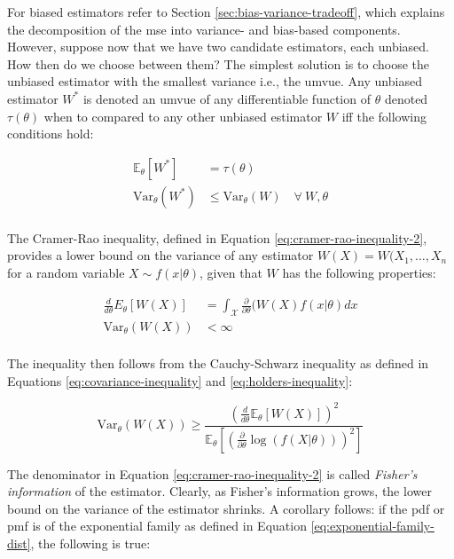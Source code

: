 \documentclass{report}
\begin{document}
For biased estimators refer to Section \ref{sec:bias-variance-tradeoff}, which explains the decomposition of the \gls{mse} into variance- and bias-based components. However, suppose now that we have two candidate estimators, each unbiased. How then do we choose between them? The simplest solution is to choose the unbiased estimator with the smallest variance i.e., the \gls{umvue}. Any unbiased estimator $W^*$ is denoted an \gls{umvue} of any differentiable function of $\theta$ denoted $\tau(\theta)$ when to compared to any other unbiased estimator $W$ \gls{iff} the following conditions hold:

\begin{equation}\label{eq:umvue-properties}
    \begin{aligned}
        \mathbb{E}_\theta[W^*] &= \tau(\theta) \\
        \text{Var}_\theta(W^*) &\leq \text{Var}_\theta(W) \quad \forall \: W, \theta \\
    \end{aligned}
\end{equation}

The Cramer-Rao inequality, defined in Equation \ref{eq:cramer-rao-inequality-2}, provides a lower bound on the variance of any estimator $W(X) = W(X_1, \dots, X_n$ for a random variable $X \sim f(x|\theta)$, given that $W$ has the following properties:

\begin{equation}\label{eq:cramer-rao-inequality-1}
    \begin{aligned}
        \frac{d}{d\theta} E_\theta[W(X)] &= \int_{\mathcal{X}} \frac{\partial}{\partial\theta} (W(X)f(x|\theta) dx \\
        \text{Var}_\theta(W(X)) &< \infty \\
    \end{aligned}
\end{equation}

The inequality then follows from the Cauchy-Schwarz inequality as defined in Equations \ref{eq:covariance-inequality} and \ref{eq:holders-inequality}:

\begin{equation}\label{eq:cramer-rao-inequality-2}
    \text{Var}_\theta(W(X)) \geq \frac{\left(\frac{d}{d\theta}\mathbb{E}_\theta[W(X)]\right)^2}{\mathbb{E}_\theta\left[\left(\frac{\partial}{\partial\theta}\log(f(X|\theta))\right)^2\right]}
\end{equation}

The denominator in Equation \ref{eq:cramer-rao-inequality-2} is called \textit{Fisher's information} of the estimator. Clearly, as Fisher's information grows, the lower bound on the variance of the estimator shrinks. A corollary follows: if the \gls{pdf} or \gls{pmf} is of the exponential family as defined in Equation \ref{eq:exponential-family-dist}, the following is true:
\end{document}
